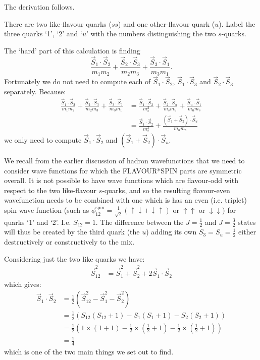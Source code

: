 \documentclass[txfonts]{NSTexam}
\begin{document}
\begin{questions}
\begin{allparts}
{The derivation follows.

There are two like-flavour quarks ($ss$) and one other-flavour quark ($u$). Label the three quarks `1', `2' and `$u$' with the numbers distinguishing the two $s$-quarks.

The `hard' part of this calculation is finding 
$$
\frac{\vec S_1 \cdot \vec S_2}{m_1 m_2}
+
\frac{\vec S_2 \cdot \vec S_3}{m_2 m_3}
+
\frac{\vec S_3 \cdot \vec S_1}{m_3 m_1}.
$$
Fortunately we do not need to compute each of  $\vec S_1\cdot \vec S_2$, $\vec S_1\cdot \vec S_3$ and $\vec S_2\cdot \vec S_3$ separately.  Because:
\begin{align}
\frac{\vec S_1 \cdot \vec S_2}{m_1 m_2}
+
\frac{\vec S_2 \cdot \vec S_3}{m_2 m_3}
+
\frac{\vec S_3 \cdot \vec S_1}{m_3 m_1}
&=
\frac{\vec S_1 \cdot \vec S_2}{m_s^2}
+
\frac{\vec S_2 \cdot \vec S_u}{m_s m_u}
+
\frac{\vec S_u \cdot \vec S_1}{m_u m_s}\nonumber
\\
&=
\frac{\vec S_1 \cdot \vec S_2}{m_s^2}
+
\frac{\left(\vec S_1+\vec S_2\right) \cdot \vec S_u}{m_u m_s}\label{eq:forsubback}
\end{align}
we only need to compute $\vec S_1 \cdot \vec S_2$ and $\left(\vec S_1+\vec S_2\right) \cdot \vec S_u$.

We recall from the earlier discussion of hadron wavefunctions that we need to consider wave functions for which the FLAVOUR*SPIN parts are symmetric overall. It is not possible to have wave functions which are flavour-odd with respect to the two like-flavour $s$-quarks, and so the resulting flavour-even wavefunction needs to be combined with one which is has an even (i.e. triplet) spin wave function (such as  $\phi^{\text{spin}}_{1 2}=\frac 1 {\sqrt 2} ( \uparrow \downarrow + \downarrow \uparrow)$ or  $\uparrow\uparrow$ or $\downarrow\downarrow$) for quarks `1' and `2'.  I.e. $S_{12}=1$. The difference between the $J=\frac 1 2$ and $J=\frac 3 2$ states will thus be created by  the third quark (the $u$) adding its own $S_3=S_u=\frac 1 2$ either destructively or constructively to the mix.

Considering just the two like quarks we have:
\begin{align}
\vec S_{12}^2 
&= 
\vec S_1^2 +
\vec S_2^2 +
2\vec S_1\cdot \vec S_2
\end{align}
which gives:
\begin{align}
\vec S_1\cdot \vec S_2
&=
\frac 1 2 \left(
\vec S_{12}^2 
-
\vec S_1^2 -
\vec S_2^2 \nonumber
\right)\\
&=
\frac 1 2
\left(
S_{12}(S_{12}+1)
-
S_{1}(S_{1}+1)
-
S_{2}(S_{2}+1)\nonumber
\right)\\
&=
\frac 1 2
\left(
1
\times(1+1)
-
{\frac 1 2}\times({\frac 1 2}+1)
-
{\frac 1 2}\times({\frac 1 2}+1)
\right)\nonumber
\\
&= \frac 1 4 \label{eq:quarter}
\end{align}
which is one of the two main things we set out to find.

}
\end{allparts}
\end{questions}
\end{document}
